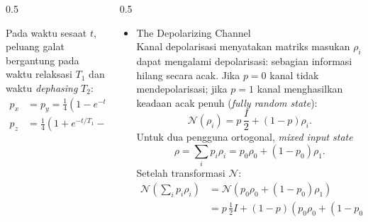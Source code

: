 \begin{frame}
\begin{columns}[T]
\begin{column}{0.5\textwidth}
\begin{itemize}
{                    Pada waktu sesaat $t$, peluang galat bergantung pada waktu
                    relaksasi $T_1$ dan waktu \textit{dephasing} $T_2$:
                    \begin{equation}
                        \begin{aligned}
                            p_x &= p_y = \frac{1}{4}\left(1-e^{-t/T_2}\right)\\
                            p_z &= \frac{1}{4}\left(1+e^{-t/T_1}-2e^{-t/T_2}\right)
                        \end{aligned}
                    \end{equation}}
            \end{itemize}
        \end{column}

        \begin{column}{0.5\textwidth}\vspace{-0.5cm}
            \small\justifying
            \begin{itemize}
                \item The Depolarizing Channel \\
                    {\fontsize{4}{6}\selectfont\justifying
                    Kanal depolarisasi menyatakan matriks masukan $\rho_i$
                    dapat mengalami depolarisasi: sebagian informasi hilang
                    secara acak. Jika $p=0$ kanal tidak mendepolarisasi;
                    jika $p=1$ kanal menghasilkan keadaan acak penuh
                    (\textit{fully random state}):
                    \begin{equation}
                        \mathcal{N}(\rho_i)=p\,\frac{I}{2}+(1-p)\rho_i.
                    \end{equation}
                    Untuk dua pengguna ortogonal, \textit{mixed input state}
                    \begin{equation}
                        \rho=\sum_i p_i\rho_i=p_0\rho_0+(1-p_0)\rho_1.
                    \end{equation}
                    Setelah transformasi $\mathcal{N}$:
                    \begin{equation}
                        \begin{aligned}
                            \mathcal{N}\!\left(\sum_i p_i\rho_i\right)
                                &= \mathcal{N}\!\left(p_0\rho_0+(1-p_0)\rho_1\right)\\
                                &= p\,\frac{1}{2}I+(1-p)\left(p_0\rho_0+(1-p_0)\rho_1\right).
                        \end{aligned}
                    \end{equation}}
            \end{itemize}
        \end{column}
    \end{columns}
\end{frame}

